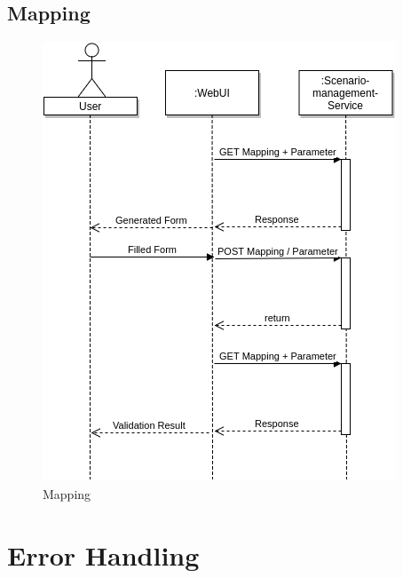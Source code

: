 \subsection{Mapping}
\begin{figure}[H]
	\centering\includegraphics[width=.65\textwidth]{res/Mapping}
	\caption{Mapping}
	\label{fig:mapping}
\end{figure}


\section{Error Handling}
